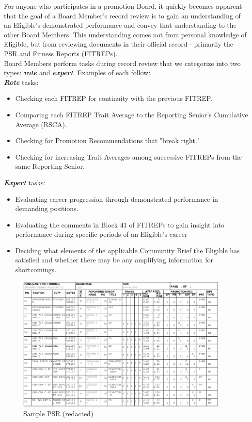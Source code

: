 \documentclass[UTF8]{article}
\begin{document}
For anyone who participates in a promotion Board, it quickly becomes apparent
that the goal of a Board Member's record review is to gain an understanding of
an Eligible's demonstrated performance and convey that understanding to the
other Board Members. This understanding comes not from personal knowledge of
Eligible, but from reviewing documents in their official record - primarily the
PSR and Fitness Reports (FITREPs).\\


Board Members perform tasks during record review that we categorize into two
types:
\textit{\textbf{rote}} and \textit{\textbf{expert}}. Examples of each follow:\\

\textit{\textbf{Rote}} tasks: 
\begin{itemize}
  \item Checking each FITREP for continuity with the previous FITREP.
  \item Comparing each FITREP Trait Average to the Reporting Senior's Cumulative
  Average (RSCA).
  \item Checking for Promotion Recommendations that "break right."
  \item Checking for increasing Trait Averages among successive FITREPs from the
  same Reporting Senior. 
\end{itemize}

\textit{\textbf{Expert}} tasks: 
\begin{itemize}
  \item Evaluating career progression through demonstrated performance in
  demanding positions.
  \item Evaluating the comments in Block 41 of FITREPs to gain insight into 
  performance during specific periods of an Eligible's career
  \item Deciding what elements of the applicable Community Brief the Eligible
  has satisfied and whether there may be any amplifying information for
  shortcomings.
\end{itemize}

\begin{figure}[h!]
 \centering
 \includegraphics[width=0.95\textwidth]{blurred_psr.png}
 \caption{Sample PSR (redacted)}
\end{figure}
\end{document}

